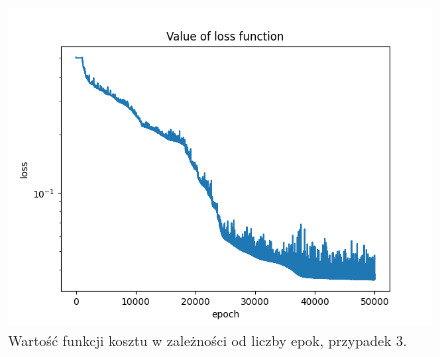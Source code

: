 \documentclass[11pt, leqno]{scrartcl}
\begin{document}
    \begin{figure}[H]
        \centering
        \includegraphics[width=0.7\linewidth]{nn_b2_loss.png}
        \caption{Wartość funkcji kosztu w zależności od liczby epok,
            przypadek 3.}
    \end{figure}
\end{document}
